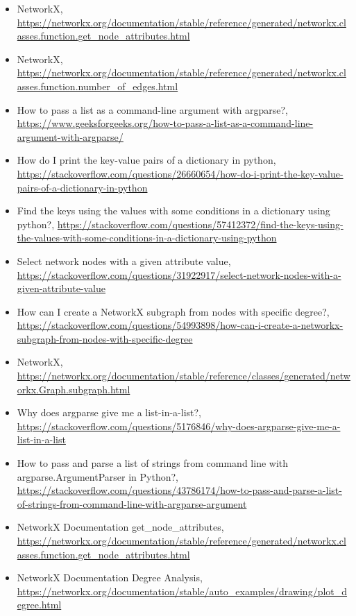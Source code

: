 \documentclass[12pt]{article}
\begin{document}
\begin{itemize}
    \item {NetworkX, \url{https://networkx.org/documentation/stable/reference/generated/networkx.classes.function.get_node_attributes.html}}
    \item {NetworkX, \url{https://networkx.org/documentation/stable/reference/generated/networkx.classes.function.number_of_edges.html}}
    \item {How to pass a list as a command-line argument with argparse?, \url{https://www.geeksforgeeks.org/how-to-pass-a-list-as-a-command-line-argument-with-argparse/}}
    \item {How do I print the key-value pairs of a dictionary in python, \url{https://stackoverflow.com/questions/26660654/how-do-i-print-the-key-value-pairs-of-a-dictionary-in-python}}
    \item {Find the keys using the values with some conditions in a dictionary using python?, \url{https://stackoverflow.com/questions/57412372/find-the-keys-using-the-values-with-some-conditions-in-a-dictionary-using-python}}
    \item {Select network nodes with a given attribute value, \url{https://stackoverflow.com/questions/31922917/select-network-nodes-with-a-given-attribute-value}}
    \item {How can I create a NetworkX subgraph from nodes with specific degree?, \url{https://stackoverflow.com/questions/54993898/how-can-i-create-a-networkx-subgraph-from-nodes-with-specific-degree}}
    \item {NetworkX, \url{https://networkx.org/documentation/stable/reference/classes/generated/networkx.Graph.subgraph.html}}
    \item {Why does argparse give me a list-in-a-list?, \url{https://stackoverflow.com/questions/5176846/why-does-argparse-give-me-a-list-in-a-list}}
    \item {How to pass and parse a list of strings from command line with argparse.ArgumentParser in Python?, \url{https://stackoverflow.com/questions/43786174/how-to-pass-and-parse-a-list-of-strings-from-command-line-with-argparse-argument}}
    \item {NetworkX Documentation get\_node\_attributes, \url{https://networkx.org/documentation/stable/reference/generated/networkx.classes.function.get_node_attributes.html}}
    \item {NetworkX Documentation Degree Analysis, \url{https://networkx.org/documentation/stable/auto_examples/drawing/plot_degree.html}}

\end{itemize}
\end{document}
